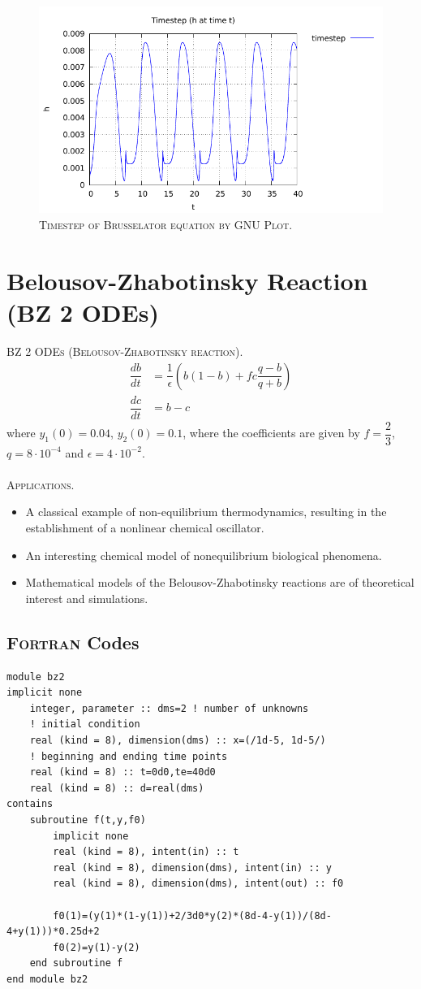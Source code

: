 \documentclass[a4paper,oneside]{book}
\numberwithin{equation}{chapter}
\begin{document}
\begin{figure}[H]
\centering
\includegraphics[scale=1.15]{b_ts}
\caption{\textsc{Timestep of Brusselator equation by GNU Plot.}}
\end{figure}
\section{Belousov-Zhabotinsky Reaction (BZ 2 ODEs)}
\textsc{BZ 2 ODEs (Belousov-Zhabotinsky reaction).} 
\begin{align}
    \dfrac{db}{dt}  &=  \dfrac{1}{\epsilon} \left( b\left(1-b\right) + fc\dfrac{q-b}{q+b} \right)
    \\
    \dfrac{dc}{dt}  &=  b-c
\end{align}
where $y_1\left(0\right) = 0.04$, $y_2\left(0\right) = 0.1$, where the coefficients are given by $f = \dfrac{2}{3}$, $q = 8\cdot 10^{-4}$ and $\epsilon = 4\cdot 10^{-2}$.\\
\\
\textsc{Applications.}
\begin{itemize}
\item A classical example of non-equilibrium thermodynamics, resulting in the establishment of a nonlinear chemical oscillator.
\item An interesting chemical model of nonequilibrium biological phenomena.
\item Mathematical models of the Belousov-Zhabotinsky reactions are of theoretical interest and simulations.
\end{itemize}

\subsection{\textsc{Fortran} Codes}
\begin{lstlisting}
module bz2  
implicit none 
	integer, parameter :: dms=2 ! number of unknowns
	! initial condition
	real (kind = 8), dimension(dms) :: x=(/1d-5, 1d-5/)
	! beginning and ending time points 
	real (kind = 8) :: t=0d0,te=40d0 
	real (kind = 8) :: d=real(dms)
contains      
	subroutine f(t,y,f0)
		implicit none
		real (kind = 8), intent(in) :: t
		real (kind = 8), dimension(dms), intent(in) :: y
		real (kind = 8), dimension(dms), intent(out) :: f0
		
		f0(1)=(y(1)*(1-y(1))+2/3d0*y(2)*(8d-4-y(1))/(8d-4+y(1)))*0.25d+2
		f0(2)=y(1)-y(2)
	end subroutine f
end module bz2
\end{lstlisting}
\end{document}

